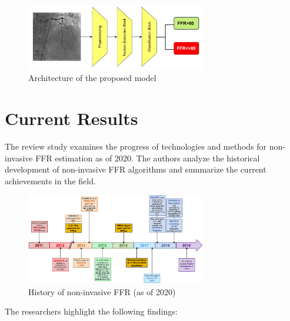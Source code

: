 \documentclass[default]{subfiles}
\begin{document}
\begin{figure}[H]
    \centering
    \includegraphics[width=0.7\textwidth]{image/pic4.png}
    \caption{Architecture of the proposed model \cite{arefinia2024deepffr}}
\end{figure}

\section{Current Results}

The review study \cite{khav2020ctffr} examines the progress of technologies and methods for non-invasive FFR estimation
as of 2020. The authors analyze the historical development of non-invasive FFR algorithms and summarize the current
achievements in the field.

\begin{figure}[H]
    \centering
    \includegraphics[width=0.7\textwidth]{image/pic5.png}
    \caption{History of non-invasive FFR (as of 2020) \cite{khav2020ctffr}}
\end{figure}

The researchers highlight the following findings: \newline
\end{document}
